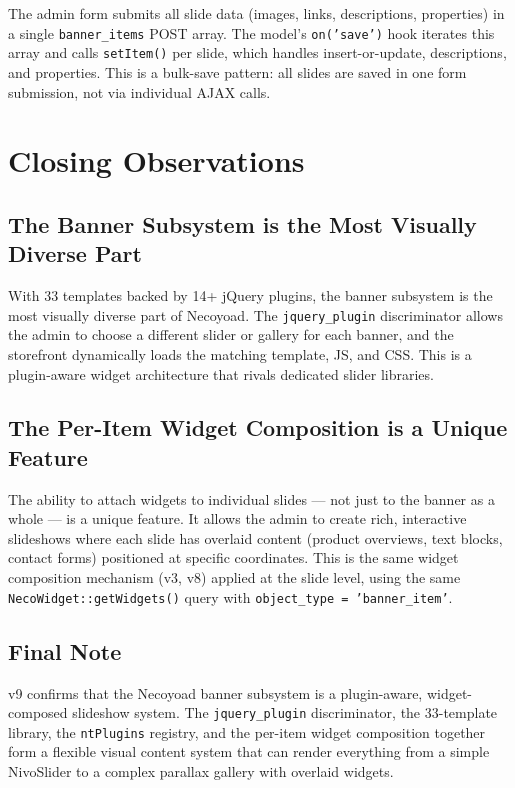 \documentclass[11pt,a4paper]{article}
\begin{document}
The admin form submits all slide data (images, links, descriptions,
properties) in a single \texttt{banner\_items} POST array. The
model's \texttt{on('save')} hook iterates this array and calls
\texttt{setItem()} per slide, which handles insert-or-update,
descriptions, and properties. This is a bulk-save pattern: all slides
are saved in one form submission, not via individual AJAX calls.

\section{Closing Observations}\label{sec:observations}

\subsection{The Banner Subsystem is the Most Visually Diverse Part}

With 33 templates backed by 14+ jQuery plugins, the banner subsystem
is the most visually diverse part of Necoyoad. The
\texttt{jquery\_plugin} discriminator allows the admin to choose a
different slider or gallery for each banner, and the storefront
dynamically loads the matching template, JS, and CSS. This is a
plugin-aware widget architecture that rivals dedicated slider
libraries.

\subsection{The Per-Item Widget Composition is a Unique Feature}

The ability to attach widgets to individual slides --- not just to
the banner as a whole --- is a unique feature. It allows the admin
to create rich, interactive slideshows where each slide has
overlaid content (product overviews, text blocks, contact forms)
positioned at specific coordinates. This is the same widget
composition mechanism (v3, v8) applied at the slide level, using
the same \texttt{NecoWidget::getWidgets()} query with
\texttt{object\_type = 'banner\_item'}.

\subsection{Final Note}

v9 confirms that the Necoyoad banner subsystem is a plugin-aware,
widget-composed slideshow system. The \texttt{jquery\_plugin}
discriminator, the 33-template library, the \texttt{ntPlugins}
registry, and the per-item widget composition together form a
flexible visual content system that can render everything from a
simple NivoSlider to a complex parallax gallery with overlaid
widgets.
\end{document}
